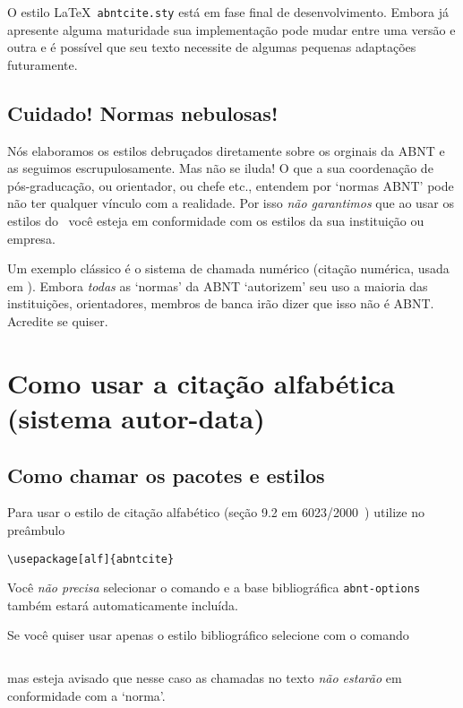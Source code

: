 \documentclass[espacosimples]{abnt}
\begin{document}
O estilo \LaTeX\ {\tt abntcite.sty} está em fase final de desenvolvimento.
Embora já apresente alguma maturidade sua implementação pode mudar entre
uma versão e outra e é possível que seu texto necessite de algumas
pequenas adaptações futuramente.

\section{Cuidado! Normas nebulosas!}

Nós elaboramos os estilos debruçados diretamente sobre os orginais da ABNT
e as seguimos escrupulosamente. Mas não se iluda! O que a sua coordenação
de pós-graducação, ou orientador, ou chefe etc., entendem por `normas ABNT'
pode não ter qualquer vínculo com a realidade. Por isso \emph{não garantimos}
que ao usar os estilos do \abnTeX\ você esteja em conformidade com os estilos
da sua instituição ou empresa.

Um exemplo clássico é o sistema de chamada numérico
(citação numérica, usada em \cite{abnt-bibtex-doc}).
Embora \emph{todas} as `normas' da ABNT \cite{NBR10520:1988,NBR6023:2000,NBR6023:2002,NBR10520:2001,NBR10520:2002}
`autorizem' seu uso a maioria das instituições, orientadores, membros de banca
irão dizer que isso não é ABNT. Acredite se quiser.

\chapter{Como usar a citação alfabética (sistema autor-data)}

\section{Como chamar os pacotes e estilos}

Para usar o estilo de citação alfabético
(seção 9.2 em 6023/2000~\cite{NBR6023:2000})
utilize no preâmbulo
\begin{verbatim}
\usepackage[alf]{abntcite}
\end{verbatim}
Você \emph{não precisa} selecionar o comando \verb++
e a base bibliográfica \verb+abnt-options+ também estará automaticamente
incluída.

Se você quiser usar apenas o estilo bibliográfico
selecione com o comando
\begin{verbatim}

\end{verbatim}
mas esteja avisado que nesse caso as chamadas no texto \emph{não estarão}
em conformidade com a `norma'.
\end{document}
